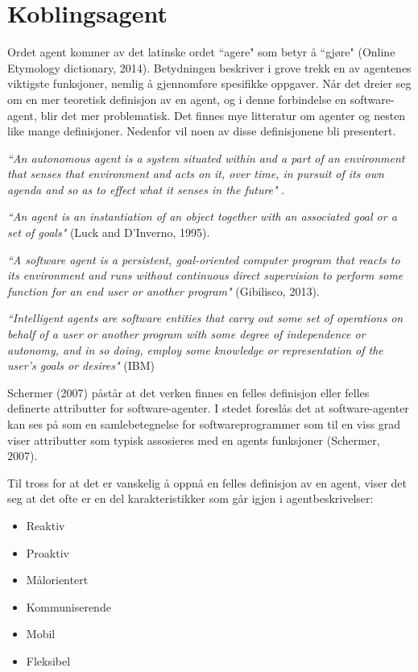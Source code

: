 \section{Koblingsagent}
Ordet agent kommer av det latinske ordet ``agere" som betyr å ``gjøre" (Online Etymology dictionary, 2014). Betydningen beskriver i grove trekk en av agentenes viktigste funksjoner, nemlig å gjennomføre spesifikke oppgaver. Når det dreier seg om en mer teoretisk definisjon av en agent, og i denne forbindelse en software-agent, blir det mer problematisk. Det finnes mye litteratur om agenter og nesten like mange definisjoner. Nedenfor vil noen av disse definisjonene bli presentert.

\textit{``An autonomous agent is a system situated within and a part of an environment
that senses that environment and acts on it, over time, in pursuit of its own agenda
and so as to effect what it senses in the future"} \cite{agent}.

\textit{``An agent is an instantiation of an object together with an associated goal or a set of goals"} (Luck and D'Inverno, 1995).

\textit{``A software agent is a persistent, goal-oriented computer program that reacts to its environment and runs without continuous direct supervision to perform some function for an end user or another program"} (Gibilisco, 2013).

\textit{``Intelligent agents are software entities that carry out some set of operations on behalf of a user or another program with some degree of independence or autonomy, and in so doing,
employ some knowledge or representation of the user's goals or desires"} (IBM)

Schermer (2007) påstår at det verken finnes en felles definisjon eller felles definerte attributter for software-agenter. I stedet foreslås det at software-agenter kan ses på som en samlebetegnelse for softwareprogrammer som til en viss grad viser attributter som typisk assosieres med en agents funksjoner (Schermer, 2007).

Til tross for at det er vanskelig å oppnå en felles definisjon av en agent, viser det seg at det ofte er en del karakteristikker som går igjen i agentbeskrivelser:
\begin{itemize}
\item Reaktiv
\item Proaktiv
\item Målorientert
\item Kommuniserende
\item Mobil
\item Fleksibel
\end{itemize}

